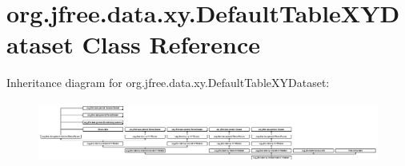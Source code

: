 \hypertarget{classorg_1_1jfree_1_1data_1_1xy_1_1_default_table_x_y_dataset}{}\section{org.\+jfree.\+data.\+xy.\+Default\+Table\+X\+Y\+Dataset Class Reference}
\label{classorg_1_1jfree_1_1data_1_1xy_1_1_default_table_x_y_dataset}
Inheritance diagram for org.\+jfree.\+data.\+xy.\+Default\+Table\+X\+Y\+Dataset\+:\begin{figure}[H]
\begin{center}
\leavevmode
\includegraphics[height=2.051282cm]{classorg_1_1jfree_1_1data_1_1xy_1_1_default_table_x_y_dataset}
\end{center}
\end{figure}
